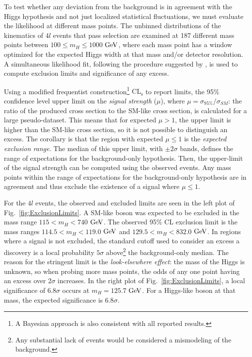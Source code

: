 To test whether any deviation from the background is in agreement with the Higgs hypothesis and not just localized statistical fluctuations, we must evaluate the likelihood at different mass points. The unbinned distributions of the kinematics of $4l$ events that pass selection are examined at 187 different mass points between $100\leq m_{H} \leq 1000$ $\rm{GeV}$, where each mass point has a window optimized for the expected Higgs width at that mass and/or detector resolution. A simultaneous likelihood fit, following the procedure suggested by \cite{}, is used to compute exclusion limits and significance of any excess.

Using a modified frequentist construction\footnote{A Bayesian approach \cite{} is also consistent with all reported results.} $\mathrm{CL_s}$ \cite{} to report limits, the 95\% confidence level upper limit on the \textit{signal strength} ($\mu$), where $\mu=\sigma_{95\%}/\sigma_{SM}$: the ratio of the produced cross section to the SM-like cross section, is calculated for a large pseudo-dataset. This means that for expected $\mu>1$, the upper limit is higher than the SM-like cross section, so it is not possible to distinguish an excess. The corollary is that the region with expected $\mu\leq1$ is the \textit{expected exclusion range}. The median of this upper limit, with $\pm2\sigma$ bands, defines the range of expectations for the background-only hypothesis. Then, the upper-limit of the signal strength can be computed using the observed events. Any mass points within the range of expectations for the background-only hypothesis are in agreement and thus exclude the existence of a signal where $\mu\leq1$.

For the $4l$ events, the observed and excluded limits are seen in the left plot of Fig.~\ref{fig:ExclusionLimits}. A SM-like boson was expected to be excluded in the mass range $115< m_H <740$ $\rm{GeV}$. The observed 95\% CL exclusion limit is the mass ranges $114.5<m_H<119.0$ $\rm{GeV}$ and $129.5<m_H<832.0$ $\rm{GeV}$. In regions where a signal is not excluded, the standard cutoff used to consider an excess a discovery is a local probability $5\sigma$ above\footnote{Any substantial lack of events would be considered a mismodeling of the background.} the background-only median. The reason for the stringent limit is the \textit{look-elsewhere effect}: the mass of the Higgs is unknown, so when probing more mass points, the odds of any one point having an excess over $2\sigma$ increases. In the right plot of Fig.~\ref{fig:ExclusionLimits}, a local significance of $6.8\sigma$ occurs at $m_H=125.7$ $\rm{GeV}$. For a Higgs-like boson at that mass, the expected significance is $6.8\sigma$.


